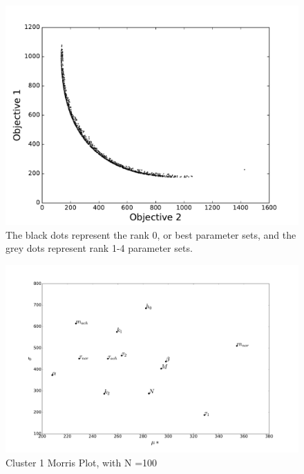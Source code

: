 \documentclass[fleqn,10pt]{wlscirep}
\begin{document}
\begin{figure}[ht]
       \centering
       \includegraphics[width=\linewidth]{figures/TradeOffCurveSlowerCooling}
       \caption{The black dots represent the rank 0, or best parameter sets, and the grey dots represent rank 1-4 parameter sets.}
       \label{fig:tradeoffcurveslower}
\end{figure}

\begin{figure}[ht]
                \centering
        \includegraphics[width=\linewidth]{figures/MorrisPlotN100Cluster1}
       \caption{Cluster 1 Morris Plot, with N =100}
       \label{fig:Cluster1Morris}
\end{figure}
\end{document}
